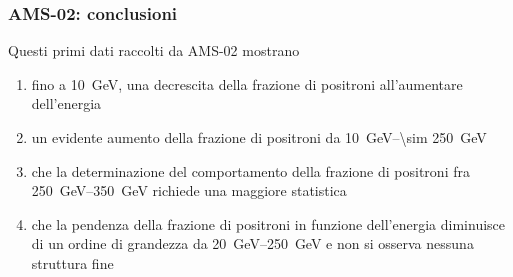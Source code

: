 \documentclass[10pt]{beamer}
\begin{document}
\begin{frame}
  \frametitle{AMS-02: conclusioni}
  Questi primi dati raccolti da AMS-02 mostrano
  \begin{enumerate}[<+->]
  \item fino a \SI{10}{\giga \electronvolt}, una
    \alert{decrescita della frazione di positroni} all'aumentare dell'energia
  \item un evidente \alert{aumento della frazione di positroni} da
    \SIrange[range-phrase={ fino a }]{10}{\sim 250}{\giga \electronvolt}
  \item che la determinazione del comportamento della frazione di positroni fra
    \SIrange[range-phrase={ e }]{250}{350}{\giga \electronvolt} richiede una
    \alert{maggiore statistica}
  \item che la
    \alert{pendenza della frazione di positroni in funzione dell'energia
      diminuisce}
    di un ordine di grandezza da
    \SIrange[range-phrase={ a }]{20}{250}{\giga \electronvolt} e non si osserva
    \alert{nessuna struttura fine}
  \end{enumerate}
\end{frame}

\section{\refname}

\begin{frame}
  \frametitle{\refname{}}
  \nocite{*}
  \printbibliography{}
\end{frame}
\end{document}
